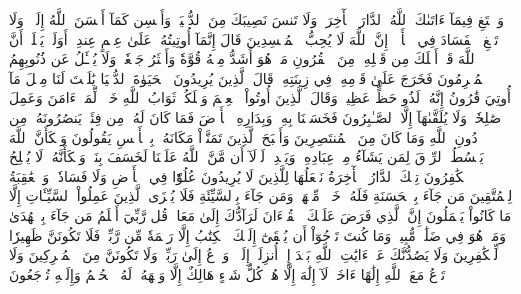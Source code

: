 وَٱبۡتَغِ فِيمَآ ءَاتَىٰكَ ٱللَّهُ ٱلدَّارَ ٱلۡأٓخِرَةَۖ وَلَا تَنسَ نَصِيبَكَ مِنَ ٱلدُّنۡيَاۖ وَأَحۡسِن كَمَآ أَحۡسَنَ ٱللَّهُ إِلَيۡكَۖ وَلَا تَبۡغِ ٱلۡفَسَادَ فِي ٱلۡأَرۡضِۖ إِنَّ ٱللَّهَ لَا يُحِبُّ ٱلۡمُفۡسِدِينَ
قَالَ إِنَّمَآ أُوتِيتُهُۥ عَلَىٰ عِلۡمٍ عِندِيٓۚ أَوَلَمۡ يَعۡلَمۡ أَنَّ ٱللَّهَ قَدۡ أَهۡلَكَ مِن قَبۡلِهِۦ مِنَ ٱلۡقُرُونِ مَنۡ هُوَ أَشَدُّ مِنۡهُ قُوَّةٗ وَأَكۡثَرُ جَمۡعٗاۚ وَلَا يُسۡـَٔلُ عَن ذُنُوبِهِمُ ٱلۡمُجۡرِمُونَ
فَخَرَجَ عَلَىٰ قَوۡمِهِۦ فِي زِينَتِهِۦۖ قَالَ ٱلَّذِينَ يُرِيدُونَ ٱلۡحَيَوٰةَ ٱلدُّنۡيَا يَٰلَيۡتَ لَنَا مِثۡلَ مَآ أُوتِيَ قَٰرُونُ إِنَّهُۥ لَذُو حَظٍّ عَظِيمٖ
وَقَالَ ٱلَّذِينَ أُوتُواْ ٱلۡعِلۡمَ وَيۡلَكُمۡ ثَوَابُ ٱللَّهِ خَيۡرٞ لِّمَنۡ ءَامَنَ وَعَمِلَ صَٰلِحٗاۚ وَلَا يُلَقَّىٰهَآ إِلَّا ٱلصَّـٰبِرُونَ
فَخَسَفۡنَا بِهِۦ وَبِدَارِهِ ٱلۡأَرۡضَ فَمَا كَانَ لَهُۥ مِن فِئَةٖ يَنصُرُونَهُۥ مِن دُونِ ٱللَّهِ وَمَا كَانَ مِنَ ٱلۡمُنتَصِرِينَ
وَأَصۡبَحَ ٱلَّذِينَ تَمَنَّوۡاْ مَكَانَهُۥ بِٱلۡأَمۡسِ يَقُولُونَ وَيۡكَأَنَّ ٱللَّهَ يَبۡسُطُ ٱلرِّزۡقَ لِمَن يَشَآءُ مِنۡ عِبَادِهِۦ وَيَقۡدِرُۖ لَوۡلَآ أَن مَّنَّ ٱللَّهُ عَلَيۡنَا لَخَسَفَ بِنَاۖ وَيۡكَأَنَّهُۥ لَا يُفۡلِحُ ٱلۡكَٰفِرُونَ
تِلۡكَ ٱلدَّارُ ٱلۡأٓخِرَةُ نَجۡعَلُهَا لِلَّذِينَ لَا يُرِيدُونَ عُلُوّٗا فِي ٱلۡأَرۡضِ وَلَا فَسَادٗاۚ وَٱلۡعَٰقِبَةُ لِلۡمُتَّقِينَ
مَن جَآءَ بِٱلۡحَسَنَةِ فَلَهُۥ خَيۡرٞ مِّنۡهَاۖ وَمَن جَآءَ بِٱلسَّيِّئَةِ فَلَا يُجۡزَى ٱلَّذِينَ عَمِلُواْ ٱلسَّيِّـَٔاتِ إِلَّا مَا كَانُواْ يَعۡمَلُونَ
إِنَّ ٱلَّذِي فَرَضَ عَلَيۡكَ ٱلۡقُرۡءَانَ لَرَآدُّكَ إِلَىٰ مَعَادٖۚ قُل رَّبِّيٓ أَعۡلَمُ مَن جَآءَ بِٱلۡهُدَىٰ وَمَنۡ هُوَ فِي ضَلَٰلٖ مُّبِينٖ
وَمَا كُنتَ تَرۡجُوٓاْ أَن يُلۡقَىٰٓ إِلَيۡكَ ٱلۡكِتَٰبُ إِلَّا رَحۡمَةٗ مِّن رَّبِّكَۖ فَلَا تَكُونَنَّ ظَهِيرٗا لِّلۡكَٰفِرِينَ
وَلَا يَصُدُّنَّكَ عَنۡ ءَايَٰتِ ٱللَّهِ بَعۡدَ إِذۡ أُنزِلَتۡ إِلَيۡكَۖ وَٱدۡعُ إِلَىٰ رَبِّكَۖ وَلَا تَكُونَنَّ مِنَ ٱلۡمُشۡرِكِينَ
وَلَا تَدۡعُ مَعَ ٱللَّهِ إِلَٰهًا ءَاخَرَۘ لَآ إِلَٰهَ إِلَّا هُوَۚ كُلُّ شَيۡءٍ هَالِكٌ إِلَّا وَجۡهَهُۥۚ لَهُ ٱلۡحُكۡمُ وَإِلَيۡهِ تُرۡجَعُونَ
